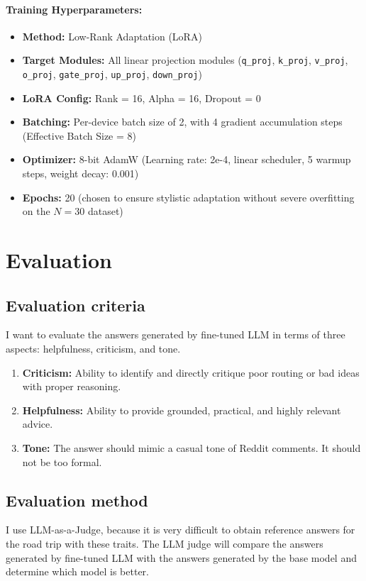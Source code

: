 \documentclass[12pt]{article}
\begin{document}
\paragraph{Training Hyperparameters:}
\begin{itemize}
    \item \textbf{Method:} Low-Rank Adaptation (LoRA)
    \item \textbf{Target Modules:} All linear projection modules (\texttt{q\_proj}, \texttt{k\_proj}, \texttt{v\_proj}, \texttt{o\_proj}, \texttt{gate\_proj}, \texttt{up\_proj}, \texttt{down\_proj})
    \item \textbf{LoRA Config:} Rank = 16, Alpha = 16, Dropout = 0
    \item \textbf{Batching:} Per-device batch size of 2, with 4 gradient accumulation steps (Effective Batch Size = 8)
    \item \textbf{Optimizer:} 8-bit AdamW (Learning rate: 2e-4, linear scheduler, 5 warmup steps, weight decay: 0.001)
    \item \textbf{Epochs:} 20 (chosen to ensure stylistic adaptation without severe overfitting on the $N=30$ dataset)
\end{itemize}

\section{Evaluation}

\subsection{Evaluation criteria}
I want to evaluate the answers generated by fine-tuned LLM in terms of three aspects: helpfulness, criticism, and tone.

\begin{enumerate}
    \item \textbf{Criticism:} Ability to identify and directly critique poor routing or bad ideas with proper reasoning.
    \item \textbf{Helpfulness:} Ability to provide grounded, practical, and highly relevant advice.
    \item \textbf{Tone:} The answer should mimic a casual tone of Reddit comments. It should not be too formal.
\end{enumerate}

\subsection{Evaluation method}
I use LLM-as-a-Judge, because it is very difficult to obtain reference answers for the road trip with these traits. The LLM judge will compare the answers generated by fine-tuned LLM with the answers generated by the base model and determine which model is better.
\end{document}
